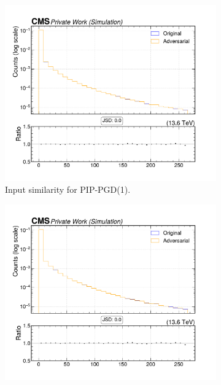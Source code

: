 \begin{figure}[htbp]
  \centering
  \begin{subfigure}[t]{0.32\textwidth}
    \includegraphics[width=\linewidth]{media/output/features/compare/combined_it_1/cmp_vtx_arr_sv_dxysig.pdf}
    \caption*{Input similarity for PIP-PGD(1).}
  \end{subfigure}\hfill
  \begin{subfigure}[t]{0.32\textwidth}
    \includegraphics[width=\linewidth]{media/output/features/compare/combined_it_2/cmp_vtx_arr_sv_dxysig.pdf}

\end{subfigure}
\end{figure}
